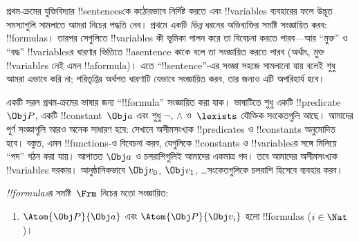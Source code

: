 \documentclass[../../../include/open-logic-section]{subfiles}
\begin{document}

\section{}

প্রথম-ক্রমের যুক্তিবিদ্যার !!{sentence}sকে কঠোরভাবে নির্দিষ্ট করতে এবং
!!{variable}s ব্যবহারের ফলে উদ্ভূত সমস্যাগুলি সামলাতে আমরা নিচের পদ্ধতি
নেব। প্রথমে একটি \emph{ভিন্ন} ধরনের অভিব্যক্তির সমষ্টি সংজ্ঞায়িত করব:
!!{formula}s। তারপর সেগুলিতে !!{variable}s কী ভূমিকা পালন করে তা বিবেচনা
করতে পারব—আর “মুক্ত” ও “বদ্ধ” !!{variable}sর ধারণার ভিত্তিতে
!!a{sentence} কাকে বলে তা সংজ্ঞায়িত করতে পারব (অর্থাৎ, মুক্ত
!!{variable}s নেই এমন !!a{formula})। এতে “!!{sentence}”-এর সংজ্ঞা সহজে
সামলানো যায় বলেই শুধু আমরা এভাবে করি না; পরিতৃপ্তির অর্থগত ধারণাটি
যেভাবে সংজ্ঞায়িত করব, তার জন্যও এটি অপরিহার্য হবে।

একটি সরল প্রথম-ক্রমের ভাষার জন্য “!!{formula}” সংজ্ঞায়িত করা যাক। ভাষাটিতে
শুধু একটি !!{predicate}~$\Obj P$, একটি !!{constant}~$\Obj a$ এবং শুধু
$\lnot$, $\land$ ও~$\lexists$ যৌক্তিক সংকেতগুলি আছে। আমাদের পূর্ণ
সংজ্ঞাগুলি আরও অনেক সাধারণ হবে: সেখানে অসীমসংখ্যক !!{predicate}s ও
!!{constant}s অনুমোদিত হবে। বস্তুত, এমন !!{function}s-ও বিবেচনা করব,
যেগুলিকে !!{constant}s ও !!{variable}sর সঙ্গে মিলিয়ে “পদ” গঠন করা
যায়। আপাতত $\Obj a$ ও চলরাশিগুলিই আমাদের একমাত্র পদ। তবে আমাদের
অসীমসংখ্যক !!{variable}s দরকার। আনুষ্ঠানিকভাবে $\Obj v_0$, $\Obj v_1$,
\dots সংকেতগুলিকে চলরাশি হিসেবে ব্যবহার করব।

\begin{defn}
\emph{!!{formula}s}র সমষ্টি~$\Frm$ নিচের মতো সংজ্ঞায়িত:
\begin{enumerate}
\item{} $\Atom{\Obj P}{\Obj a}$ এবং $\Atom{\Obj
  P}{\Obj v_i}$ হলো !!{formula}s ($i \in \Nat$)।




\end{enumerate}
\end{defn}
\end{document}
